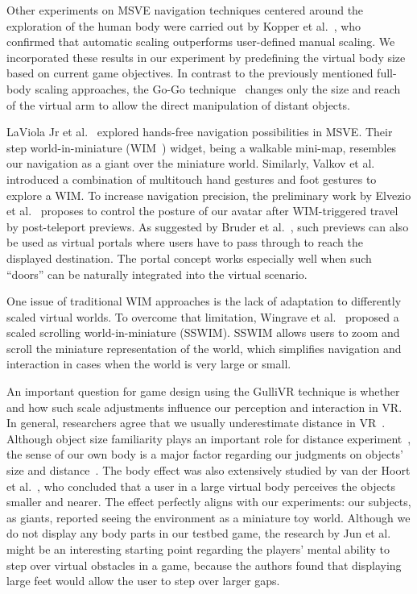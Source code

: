 \documentclass{sigchi}
\begin{document}
Other experiments on MSVE navigation techniques centered around the exploration of the human body were carried out by Kopper et al.~\cite{kopper2006design}, who confirmed that automatic scaling outperforms user-defined manual scaling. We incorporated these results in our experiment by predefining the virtual body size based on current game objectives. In contrast to the previously mentioned full-body scaling approaches, the Go-Go technique~\cite{poupyrev1996go} changes only the size and reach of the virtual arm to allow the direct manipulation of distant objects.

LaViola Jr et al.~\cite{laviola2001hands} explored hands-free navigation possibilities in MSVE. Their step world-in-miniature (WIM~\cite{stoakley1995virtual}) widget, being a walkable mini-map, resembles our navigation as a giant over the miniature world. Similarly, Valkov et al.~\cite{valkov2010traveling} introduced a combination of multitouch hand gestures and foot gestures to explore a WIM. To increase navigation precision, the preliminary work by Elvezio et al.~\cite{7892386} proposes to control the posture of our avatar after WIM-triggered travel by post-teleport previews. As suggested by Bruder et al.~\cite{bruder2009arch}, such previews can also be used as virtual portals where users have to pass through to reach the displayed destination. The portal concept works especially well when such ``doors'' can be naturally integrated into the virtual scenario.


One issue of traditional WIM approaches is the lack of adaptation to differently scaled virtual worlds. To overcome that limitation, Wingrave et al.~\cite{wingrave2006overcoming} proposed a scaled scrolling world-in-miniature (SSWIM). SSWIM allows users to zoom and scroll the miniature representation of the world, which simplifies navigation and interaction in cases when the world is very large or small.




An important question for game design using the GulliVR technique is whether and how such scale adjustments influence our perception and interaction in VR. In general, researchers agree that we usually underestimate distance in VR~\cite{frenz2007estimation, renner2013perception, cutting1995perceiving}. Although object size familiarity plays an important role for distance experiment~\cite{nguyen2011effects, ogawa2017distortion}, the sense of our own body is a major factor regarding our judgments on objects' size and distance~\cite{kokkinara2015effects}. The body effect was also extensively studied by van der Hoort et al.~\cite{van2011being}, who concluded that a user in a large virtual body perceives the objects smaller and nearer. The effect perfectly aligns with our experiments: our subjects, as giants, reported seeing the environment as a miniature toy world. Although we do not display any body parts in our testbed game, the research by Jun et al.~\cite{jun2015big} might be an interesting starting point regarding the players' mental ability to step over virtual obstacles in a game, because the authors found that displaying large feet would allow the user to step over larger gaps.
\end{document}

